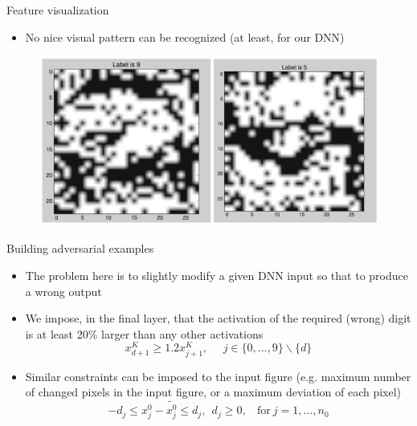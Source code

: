\documentclass{beamer}
\begin{document}
\begin{frame}{Feature visualization}
    \begin{itemize}
        \item No nice visual pattern can be recognized (at least, for our DNN)
    \end{itemize}
  \begin{figure}
    \centering
    \includegraphics[width=0.9\columnwidth]{feature_visualization.png}
  \end{figure}
\end{frame}

\begin{frame}{Building adversarial examples}
  \begin{itemize}
  \item The problem here is to slightly modify a given DNN input so that to produce a wrong output
  \item We impose, in the final layer, that the activation of the required (wrong) digit is at least 20\% larger than any other activations
  $$x_{d+1}^{K} \geq 1.2 x_{j+1}^{K},\ \ \ \ \ \ j \in \{0, ..., 9 \} \backslash \{d \}$$
  \pause
  \item Similar constraints can be imposed to the input figure (e.g. maximum number of changed pixels in the input figure, or a maximum deviation of each pixel)
  $$-d_j \leq x_j^{0} - \widetilde{x_j^{0}} \leq d_j, \ \ d_j \geq 0, \ \ \ \ \mbox{for}\  j=1, ..., n_0$$
  \end{itemize}
\end{frame}
\end{document}
